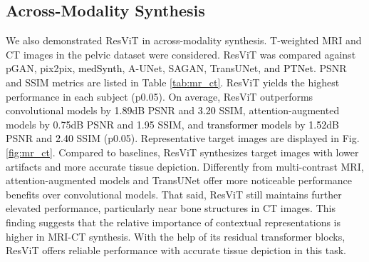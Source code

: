 \documentclass[journal,twoside,web]{ieeecolor}
\newcommand*{\revhl}{\textcolor{black}}
\begin{document}
\subsection{Across-Modality Synthesis}
We also demonstrated ResViT in across-modality synthesis. T-weighted MRI and CT images in the pelvic dataset were considered. ResViT was compared against pGAN, pix2pix, \revhl{medSynth}, A-UNet, SAGAN, TransUNet, \revhl{and PTNet}. PSNR and SSIM metrics are listed in Table \ref{tab:mr_ct}. ResViT yields the highest performance in each subject (p0.05). On average, ResViT outperforms convolutional models by \revhl{1.89}dB PSNR and \revhl{3.20} SSIM,  attention-augmented models by 0.75dB PSNR and 1.95 SSIM, and \revhl{transformer models} by \revhl{1.52}dB PSNR and \revhl{2.40} SSIM (p0.05). Representative target images are displayed in Fig. \ref{fig:mr_ct}. Compared to baselines, ResViT synthesizes target images with lower artifacts and more accurate tissue depiction.
Differently from multi-contrast MRI, attention-augmented models and TransUNet offer more noticeable performance benefits over convolutional models. That said, ResViT still maintains further elevated performance, particularly near bone structures in CT images. This finding suggests that the relative importance of contextual representations is higher in MRI-CT synthesis. With the help of its residual transformer blocks, ResViT offers reliable performance with accurate tissue depiction in this task.




\vspace{-1mm}
\end{document}
